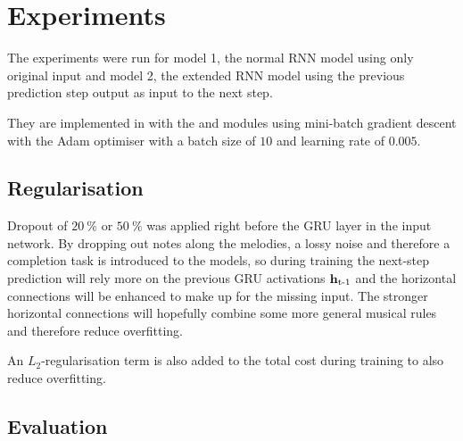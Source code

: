 \section{Experiments}
\label{sec:experiments}


The experiments were run for model 1, the normal RNN model using only original input and model 2, the extended RNN model using the previous prediction step output as input to the next step.

They are implemented in \Python with the \Theano and \Lasagne modules using mini-batch gradient descent with the Adam optimiser \cite{Kingma2014c} with a batch size of $10$ and learning rate of $0.005$.  

\subsection{Regularisation} %
\label{sub:regularization}

Dropout of $\SI{20}{\%}$ or $\SI{50}{\%}$ was applied right before the GRU layer in the input network. By dropping out notes along the melodies, a lossy noise and therefore a completion task is introduced to the models, so during training the next-step prediction will rely more on the previous GRU activations $\bm{\mathrm{h}}_{\text{t-1}}$ and the horizontal connections will be enhanced to make up for the missing input. The stronger horizontal connections will hopefully combine some more general musical rules and therefore reduce overfitting. 

An $L_2$-regularisation term is also added to the total cost during training to also reduce overfitting.



\subsection{Evaluation}

